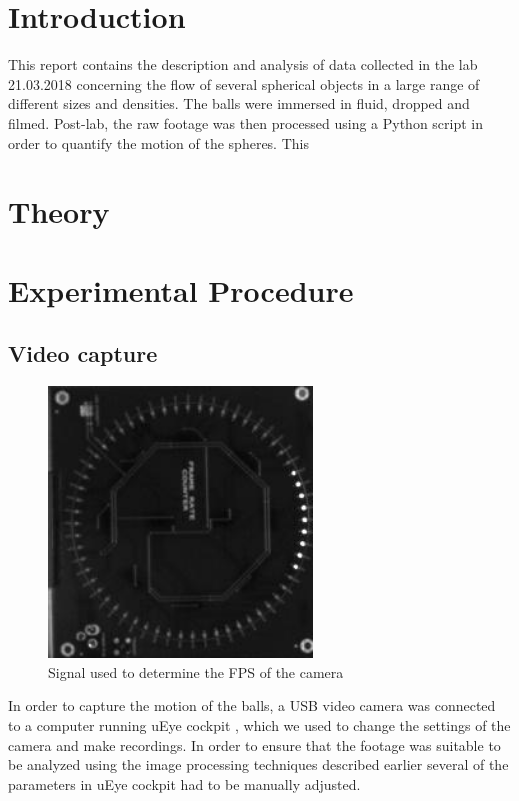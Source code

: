 \documentclass[11pt,a4paper]{article}
\begin{document}
\begin{multicols*}{2}
\section{\label{sect:intro}Introduction}
  This report contains the description and analysis of data collected in the lab 21.03.2018 concerning the flow of several spherical objects in a large range of different sizes and densities. The balls were immersed in fluid, dropped and filmed. Post-lab, the raw footage was then processed using a Python script in order to quantify the motion of the spheres. This 

\section{\label{sect:theory}Theory}

\section{\label{section:experimental}Experimental Procedure} 
  \subsection{Video capture}
    
    \begin{figure}[H]
      \center
      \includegraphics[width=7cm]{scripts/figs/sync_fps.png}
      \caption{Signal used to determine the FPS of the camera}
      \label{fig:FpsSignal}
    \end{figure}
  

    In order to capture the motion of the balls, a USB video camera was connected to a computer running uEye cockpit \cite{website:ueye}, which we used to change the settings of the camera and make recordings.
    In order to ensure that the footage was suitable to be analyzed using the image processing techniques described earlier several of the parameters in uEye cockpit had to be manually adjusted. 


\end{multicols*}
\end{document}
